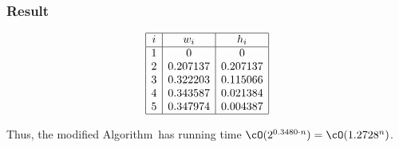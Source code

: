 \begin{frame}
 \frametitle{Result}
\[
 \begin{array}{|c|c|c|}
  \hline
  i & w_i & h_i\\
  \hline
  1 & 0 & 0\\
  2 & 0.207137 & 0.207137\\
  3 & 0.322203 & 0.115066\\
  4 & 0.343587 & 0.021384\\
  5 & 0.347974 & 0.004387\\
  \hline
 \end{array}
\]


Thus, the modified Algorithm~\algmis has running time
$\cO(2^{0.3480 \cdot n})=\cO(1.2728^n)$.

\end{frame}

%
% 
% 
% 
%
%



